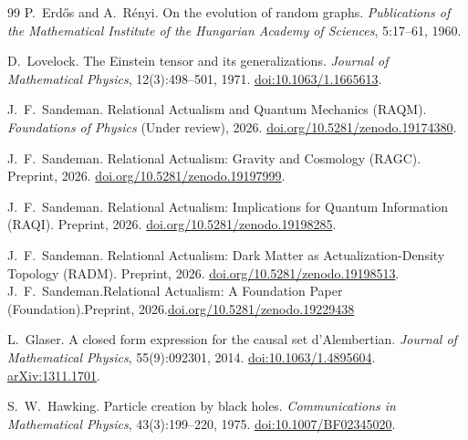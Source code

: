\documentclass[11pt,a4paper]{article}
\begin{document}
\begin{thebibliography}{99}
P.~Erd\H{o}s and A.~R\'{e}nyi.
\newblock On the evolution of random graphs.
\newblock \emph{Publications of the Mathematical Institute of the Hungarian
  Academy of Sciences}, 5:17--61, 1960.

D.~Lovelock.
\newblock The Einstein tensor and its generalizations.
\newblock \emph{Journal of Mathematical Physics}, 12(3):498--501, 1971.
\newblock \href{https://doi.org/10.1063/1.1665613}{doi:10.1063/1.1665613}.

J.~F.~Sandeman.
\newblock Relational Actualism and Quantum Mechanics ({RAQM}).
\newblock \textit{Foundations of Physics} (Under review), 2026.
\newblock \href{https://doi.org/10.5281/zenodo.19174380}{doi.org/10.5281/zenodo.19174380}.

J.~F.~Sandeman.
\newblock Relational Actualism: Gravity and Cosmology ({RAGC}).
\newblock Preprint, 2026.
\newblock \href{https://doi.org/10.5281/zenodo.19197999}{doi.org/10.5281/zenodo.19197999}.



J.~F.~Sandeman.
\newblock Relational Actualism: Implications for Quantum Information ({RAQI}).
\newblock Preprint, 2026.
\newblock \href{https://doi.org/10.5281/zenodo.19198285}{doi.org/10.5281/zenodo.19198285}.

J.~F.~Sandeman.
\newblock Relational Actualism: Dark Matter as Actualization-Density Topology ({RADM}).
\newblock Preprint, 2026.
\newblock \href{https://doi.org/10.5281/zenodo.19198513}{doi.org/10.5281/zenodo.19198513}.
J.~F.~Sandeman.\newblock Relational Actualism: A Foundation Paper ({Foundation}).\newblock Preprint, 2026.\newblock \href{https://doi.org/10.5281/zenodo.19229438}{doi.org/10.5281/zenodo.19229438}


L.~Glaser.
\newblock A closed form expression for the causal set d'Alembertian.
\newblock \emph{Journal of Mathematical Physics}, 55(9):092301, 2014.
\newblock \href{https://doi.org/10.1063/1.4895604}{doi:10.1063/1.4895604}.
\newblock \href{https://arxiv.org/abs/1311.1701}{arXiv:1311.1701}.

S.~W.~Hawking.
\newblock Particle creation by black holes.
\newblock \emph{Communications in Mathematical Physics}, 43(3):199--220, 1975.
\newblock \href{https://doi.org/10.1007/BF02345020}{doi:10.1007/BF02345020}.


\end{thebibliography}
\end{document}
